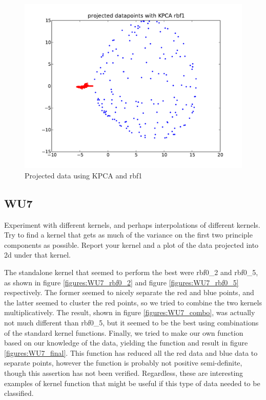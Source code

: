 \documentclass[a4paper,11pt]{article}
\begin{document}
\begin{figure}[!ht]
  \begin{center}
  \includegraphics[width=4.5in]{WU6.pdf}
  \caption{Projected data using KPCA and rbf1}
  \label{figures:WU6}
  \end{center}
\end{figure}

\pagebreak
\subsection{WU7}
\textsf{Experiment with different kernels, and perhaps interpolations 
of different kernels. Try to find a kernel that gets as much of the 
variance on the first two principle components as possible. Report your 
kernel and a plot of the data projected into 2d under that kernel.}\vspace{0.1in}

The standalone kernel that seemed to perform the best were rbf0\_2 and rbf0\_5,
as shown in figure \ref{figures:WU7_rbf0_2} and figure \ref{figures:WU7_rbf0_5}
respectively. The former seemed to nicely separate the red and blue points,
and the latter seemed to cluster the red points, so we tried to combine the two 
kernels multiplicatively. The result, shown in figure \ref{figures:WU7_combo},
was actually not much different than rbf0\_5, but it seemed to be the best using 
combinations of the standard kernel functions. Finally, we tried to make our own
function based on our knowledge of the data, yielding the function and result in
figure \ref{figures:WU7_final}. This function has reduced all the red data and blue
data to separate points, however the function is probably not positive semi-definite,
though this assertion has not been verified. Regardless, these are interesting
examples of kernel function that might be useful if this type of data needed to be classified.
\end{document}
